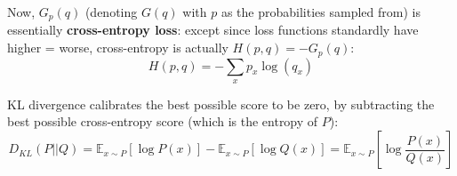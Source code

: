 \documentclass[12pt]{article}
\begin{document}
\begin{outline}
Now, $G_p(q)$ (denoting $G(q)$ with $p$ as the probabilities sampled from) is essentially \textbf{cross-entropy loss}: except since loss functions standardly have higher = worse, cross-entropy is actually $H(p,q) = -G_p(q)$:
\[ \boxed{H(p,q) = -\sum_x p_x \log(q_x)} \]

KL divergence calibrates the best possible score to be zero, by subtracting the best possible cross-entropy score (which is the entropy of $P$):
\[ D_{KL}(P||Q) = \mathbb E_{x \sim P} [\log P(x)] - \mathbb E_{x \sim P} [\log Q(x)] = \boxed{\mathbb E_{x \sim P} \left[\log \frac{P(x)}{Q(x)}\right]} \]

\end{outline}
\end{document}
